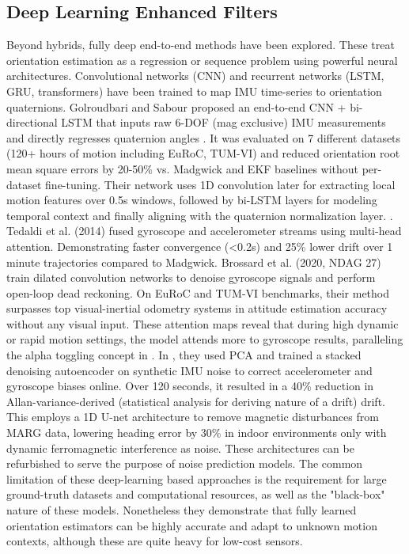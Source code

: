 \documentclass{iutbscthesis}
\begin{document}
\subsection{Deep Learning Enhanced Filters}
Beyond hybrids, fully deep end-to-end methods have been explored. These treat orientation estimation as a regression or sequence problem using powerful neural architectures. Convolutional networks (CNN) and recurrent networks (LSTM, GRU, transformers) have been trained to map IMU time-series to orientation quaternions. Golroudbari and Sabour proposed an end-to-end CNN + bi-directional LSTM that inputs raw 6-DOF (mag exclusive) IMU measurements and directly regresses quaternion angles \cite{golroudbari2023cnn6DOF}. It was evaluated on 7 different datasets (120+ hours of motion including EuRoC, TUM-VI) and reduced orientation root mean square errors by 20-50\% vs. Madgwick and EKF baselines without per-dataset fine-tuning. Their network uses 1D convolution later for extracting local motion features over 0.5s windows, followed by bi-LSTM layers for modeling temporal context and finally aligning with the quaternion normalization layer. \cite{golroudbari2023cnn6DOF}. Tedaldi et al. (2014) fused gyroscope and accelerometer streams using multi-head attention. Demonstrating faster convergence (<0.2s) and 25\% lower drift over 1 minute trajectories compared to Madgwick. \cite{tedaldi2014multihead} Brossard et al. (2020, NDAG 27)  train dilated convolution networks to denoise gyroscope signals  and perform open-loop dead reckoning. On EuRoC and TUM-VI benchmarks, their method surpasses top visual-inertial odometry systems in attitude estimation accuracy without any visual input. These attention maps reveal that during high dynamic or rapid motion settings, the model attends more to gyroscope results, paralleling the alpha toggling concept in \cite{denoising}. In \cite{vezocnik2021PCA}, they used PCA and trained a stacked denoising autoencoder on synthetic IMU noise to correct accelerometer and gyroscope biases online. Over 120 seconds, it resulted in a 40\% reduction in Allan-variance-derived (statistical analysis for deriving nature of a drift) drift. This \cite{sharman2019dlcorrection} employs a 1D U-net architecture to remove magnetic disturbances from MARG data, lowering heading error by 30\% in indoor environments only with dynamic ferromagnetic interference as noise. These architectures can be refurbished to serve the purpose of noise prediction models. The common limitation of these deep-learning based approaches is the requirement for large ground-truth datasets and computational resources, as well as the "black-box" nature of these models. Nonetheless they demonstrate that fully learned orientation estimators can be highly accurate and adapt to unknown motion contexts, although these are quite heavy for low-cost sensors.  
\end{document}
